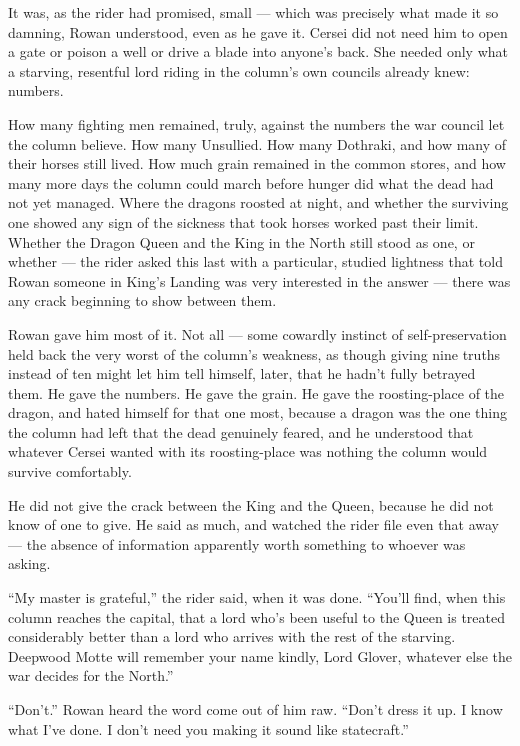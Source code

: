 It was, as the rider had promised, small — which was precisely what made it so damning, Rowan understood, even as he gave it. Cersei did not need him to open a gate or poison a well or drive a blade into anyone’s back. She needed only what a starving, resentful lord riding in the column’s own councils already knew: numbers.

How many fighting men remained, truly, against the numbers the war council let the column believe. How many Unsullied. How many Dothraki, and how many of their horses still lived. How much grain remained in the common stores, and how many more days the column could march before hunger did what the dead had not yet managed. Where the dragons roosted at night, and whether the surviving one showed any sign of the sickness that took horses worked past their limit. Whether the Dragon Queen and the King in the North still stood as one, or whether — the rider asked this last with a particular, studied lightness that told Rowan someone in King’s Landing was very interested in the answer — there was any crack beginning to show between them.

Rowan gave him most of it. Not all — some cowardly instinct of self-preservation held back the very worst of the column’s weakness, as though giving nine truths instead of ten might let him tell himself, later, that he hadn’t fully betrayed them. He gave the numbers. He gave the grain. He gave the roosting-place of the dragon, and hated himself for that one most, because a dragon was the one thing the column had left that the dead genuinely feared, and he understood that whatever Cersei wanted with its roosting-place was nothing the column would survive comfortably.

He did not give the crack between the King and the Queen, because he did not know of one to give. He said as much, and watched the rider file even that away — the absence of information apparently worth something to whoever was asking.

“My master is grateful,” the rider said, when it was done. “You’ll find, when this column reaches the capital, that a lord who’s been useful to the Queen is treated considerably better than a lord who arrives with the rest of the starving. Deepwood Motte will remember your name kindly, Lord Glover, whatever else the war decides for the North.”

“Don’t.” Rowan heard the word come out of him raw. “Don’t dress it up. I know what I’ve done. I don’t need you making it sound like statecraft.”

